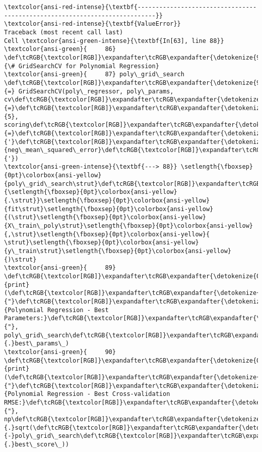 \documentclass[11pt]{article}
\begin{document}
    \begin{Verbatim}[commandchars=\\\{\}, frame=single, framerule=2mm, rulecolor=\color{outerrorbackground}]
\textcolor{ansi-red-intense}{\textbf{---------------------------------------------------------------------------}}
\textcolor{ansi-red-intense}{\textbf{ValueError}}                                Traceback (most recent call last)
Cell \textcolor{ansi-green-intense}{\textbf{In[63], line 88}}
\textcolor{ansi-green}{     86} \def\tcRGB{\textcolor[RGB]}\expandafter\tcRGB\expandafter{\detokenize{95,135,135}}{\# GridSearchCV for Polynomial Regression}
\textcolor{ansi-green}{     87} poly\_grid\_search \def\tcRGB{\textcolor[RGB]}\expandafter\tcRGB\expandafter{\detokenize{98,98,98}}{=} GridSearchCV(poly\_regressor, poly\_params, cv\def\tcRGB{\textcolor[RGB]}\expandafter\tcRGB\expandafter{\detokenize{98,98,98}}{=}\def\tcRGB{\textcolor[RGB]}\expandafter\tcRGB\expandafter{\detokenize{98,98,98}}{5}, scoring\def\tcRGB{\textcolor[RGB]}\expandafter\tcRGB\expandafter{\detokenize{98,98,98}}{=}\def\tcRGB{\textcolor[RGB]}\expandafter\tcRGB\expandafter{\detokenize{175,0,0}}{'}\def\tcRGB{\textcolor[RGB]}\expandafter\tcRGB\expandafter{\detokenize{175,0,0}}{neg\_mean\_squared\_error}\def\tcRGB{\textcolor[RGB]}\expandafter\tcRGB\expandafter{\detokenize{175,0,0}}{'})
\textcolor{ansi-green-intense}{\textbf{---> 88}} \setlength{\fboxsep}{0pt}\colorbox{ansi-yellow}{poly\_grid\_search\strut}\def\tcRGB{\textcolor[RGB]}\expandafter\tcRGB\expandafter{\detokenize{98,98,98}}{\setlength{\fboxsep}{0pt}\colorbox{ansi-yellow}{.\strut}}\setlength{\fboxsep}{0pt}\colorbox{ansi-yellow}{fit\strut}\setlength{\fboxsep}{0pt}\colorbox{ansi-yellow}{(\strut}\setlength{\fboxsep}{0pt}\colorbox{ansi-yellow}{X\_train\_poly\strut}\setlength{\fboxsep}{0pt}\colorbox{ansi-yellow}{,\strut}\setlength{\fboxsep}{0pt}\colorbox{ansi-yellow}{ \strut}\setlength{\fboxsep}{0pt}\colorbox{ansi-yellow}{y\_train\strut}\setlength{\fboxsep}{0pt}\colorbox{ansi-yellow}{)\strut}
\textcolor{ansi-green}{     89} \def\tcRGB{\textcolor[RGB]}\expandafter\tcRGB\expandafter{\detokenize{0,135,0}}{print}(\def\tcRGB{\textcolor[RGB]}\expandafter\tcRGB\expandafter{\detokenize{175,0,0}}{"}\def\tcRGB{\textcolor[RGB]}\expandafter\tcRGB\expandafter{\detokenize{175,0,0}}{Polynomial Regression - Best Parameters:}\def\tcRGB{\textcolor[RGB]}\expandafter\tcRGB\expandafter{\detokenize{175,0,0}}{"}, poly\_grid\_search\def\tcRGB{\textcolor[RGB]}\expandafter\tcRGB\expandafter{\detokenize{98,98,98}}{.}best\_params\_)
\textcolor{ansi-green}{     90} \def\tcRGB{\textcolor[RGB]}\expandafter\tcRGB\expandafter{\detokenize{0,135,0}}{print}(\def\tcRGB{\textcolor[RGB]}\expandafter\tcRGB\expandafter{\detokenize{175,0,0}}{"}\def\tcRGB{\textcolor[RGB]}\expandafter\tcRGB\expandafter{\detokenize{175,0,0}}{Polynomial Regression - Best Cross-validation RMSE:}\def\tcRGB{\textcolor[RGB]}\expandafter\tcRGB\expandafter{\detokenize{175,0,0}}{"}, np\def\tcRGB{\textcolor[RGB]}\expandafter\tcRGB\expandafter{\detokenize{98,98,98}}{.}sqrt(\def\tcRGB{\textcolor[RGB]}\expandafter\tcRGB\expandafter{\detokenize{98,98,98}}{-}poly\_grid\_search\def\tcRGB{\textcolor[RGB]}\expandafter\tcRGB\expandafter{\detokenize{98,98,98}}{.}best\_score\_))


\end{Verbatim}
\end{document}
